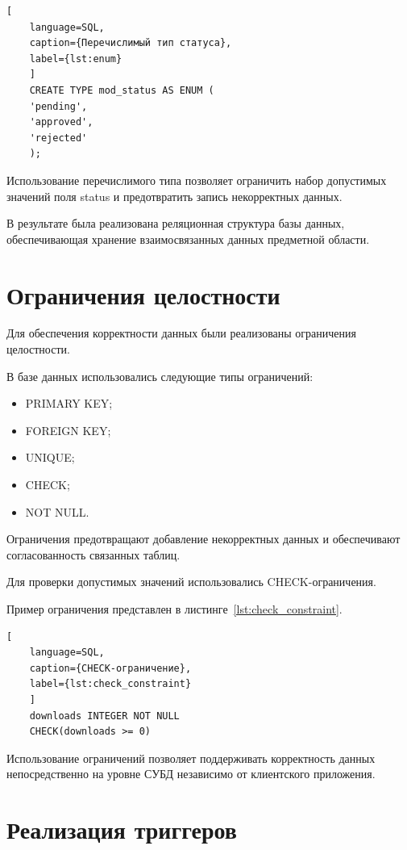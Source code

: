 \newpage
\begin{lstlisting}[
	language=SQL,
	caption={Перечислимый тип статуса},
	label={lst:enum}
	]
	CREATE TYPE mod_status AS ENUM (
	'pending',
	'approved',
	'rejected'
	);
\end{lstlisting}

Использование перечислимого типа позволяет ограничить набор допустимых
значений поля status и предотвратить запись некорректных данных.

В результате была реализована реляционная структура базы данных,
обеспечивающая хранение взаимосвязанных данных предметной области.

\section{Ограничения целостности}

Для обеспечения корректности данных были реализованы ограничения
целостности.

В базе данных использовались следующие типы ограничений:

\begin{itemize}
	\item PRIMARY KEY;
	\item FOREIGN KEY;
	\item UNIQUE;
	\item CHECK;
	\item NOT NULL.
\end{itemize}

Ограничения предотвращают добавление некорректных данных и обеспечивают
согласованность связанных таблиц.

Для проверки допустимых значений использовались CHECK-ограничения.

Пример ограничения представлен в
листинге~\ref{lst:check_constraint}.

\begin{lstlisting}[
	language=SQL,
	caption={CHECK-ограничение},
	label={lst:check_constraint}
	]
	downloads INTEGER NOT NULL
	CHECK(downloads >= 0)
\end{lstlisting}

Использование ограничений позволяет поддерживать корректность данных
непосредственно на уровне СУБД независимо от клиентского приложения.

\section{Реализация триггеров}

